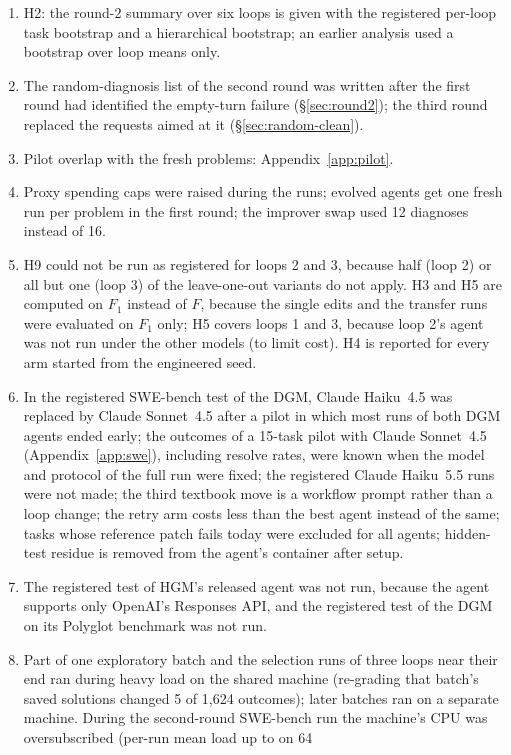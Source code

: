 \begin{enumerate}
\item H2: the round-2 summary over six loops is given with the registered per-loop task bootstrap and a hierarchical
bootstrap; an earlier analysis used a bootstrap over loop means only.
\item The random-diagnosis list of the second round was written after the first round had identified the empty-turn
failure (\S\ref{sec:round2}); the third round replaced the requests aimed at it (\S\ref{sec:random-clean}).
\item Pilot overlap with the fresh problems: Appendix~\ref{app:pilot}.
\item Proxy spending caps were raised during the runs; evolved agents get one fresh run per problem in the first round;
the improver swap used 12 diagnoses instead of 16.
\item H9 could not be run as registered for loops 2 and 3, because half (loop 2) or all but one (loop 3) of the
leave-one-out variants do not apply. H3 and H5 are computed on $F_1$ instead of $F$, because the single edits and the
transfer runs were evaluated on $F_1$ only; H5 covers loops 1 and 3, because loop 2's agent was not run under the other
models (to limit cost). H4 is reported for every arm started from the engineered seed.
\item In the registered SWE-bench test of the DGM, Claude Haiku~4.5 was replaced by Claude Sonnet~4.5 after a pilot in which most runs of both DGM
agents ended early; the outcomes of a 15-task pilot with Claude Sonnet~4.5 (Appendix~\ref{app:swe}), including resolve
rates, were known when the model and protocol of the full run were fixed; the
registered Claude Haiku~5.5 runs were not made; the third textbook move is a workflow prompt
rather than a loop change; the retry arm costs less than the best agent instead of the same; tasks whose reference
patch fails today were excluded for all agents; hidden-test residue is removed from the agent's container after setup.
\item The registered test of HGM's released agent was not run, because the agent supports only OpenAI's Responses API,
and the registered test of the DGM on its Polyglot benchmark was not run.
\item Part of one exploratory batch and the selection runs of three loops near their end ran during heavy load on the
shared machine (re-grading that batch's saved solutions changed 5 of 1{,}624 outcomes); later batches ran on a separate
machine. During the second-round SWE-bench run the machine's CPU was oversubscribed (per-run mean load up to \vloadMax{} on 64

\end{enumerate}
